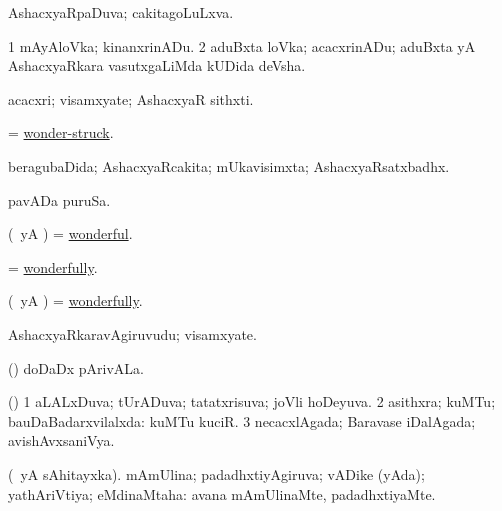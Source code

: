 \bentry
{} 
\gl{\gu}
\expl{}
\bmng
AshacxyaRpaDuva; cakitagoLuLxva. 
\emng
\eentry

\bentry
{} 
\gl{\nA}
\expl{}
\bmng
\bnum
\num{1} mAyAloVka; kinanxrinADu. 
\num{2} aduBxta loVka; acacxrinADu; aduBxta yA AshacxyaRkara vasutxgaLiMda kUDida deVsha. 
\enum
\emng
\eentry

\bentry
{} 
\gl{\nA}
\expl{}
\bmng
acacxri; visamxyate; AshacxyaR sithxti. 
\emng
\eentry

\bentry
{} 
\gl{\gu}
\expl{}
\bmng
= \hyperlink{wonder-struck}{wonder-struck}. 
\emng
\eentry

\bentry
{} 
\gl{\gu}
\expl{}
\bmng
beragubaDida; AshacxyaRcakita; mUkavisimxta; AshacxyaRsatxbadhx. 
\emng
\eentry

\bentry
{} 
\gl{\nA}
\expl{}
\bmng
pavADa puruSa. 
\emng
\eentry

\bentry
{} 
\gl{\gu}
\expl{}
\bmng
(\kAparx\ yA \rUpa) = \hyperlink{wonderful}{wonderful}. 
\emng
\eentry

\bentry
{} 
\gl{\kirxvi}
\expl{}
\bmng
 = \hyperlink{wonderfully}{wonderfully}. 
\emng
\eentry

\bentry
{} 
\gl{\kirxvi}
\expl{}
\bmng
(\kAparx\ yA \rUpa) = \hyperlink{wonderfully}{wonderfully}. 
\emng
\eentry

\bentry
{} 
\gl{\nA}
\bmng
AshacxyaRkaravAgiruvudu; visamxyate. 
\emng
\eentry

\bentry
{} 
\gl{\nA}
\expl{}
\bmng
(\AseTxrXV) doDaDx pArivALa. 
\emng
\eentry

\bentry
{} 
\gl{\gu}
\bmng
(\AmA) 
\bnum
\num{1} aLALxDuva; tUrADuva; tatatxrisuva; joVli hoDeyuva. 
\num{2} asithxra; kuMTu; bauDaBadarxvilalxda:  kuMTu kuciR. 
\num{3} necacxlAgada; Baravase iDalAgada; avishAvxsaniVya. 
\enum
\emng
\eentry

\bentry
{} 
\gl{\gu}
\expl{}
\bmng
(\pArxparx\ yA sAhitayxka). mAmUlina; padadhxtiyAgiruva; vADike (yAda); yathAriVtiya; eMdinaMtaha:  avana mAmUlinaMte, padadhxtiyaMte. 
\emng

